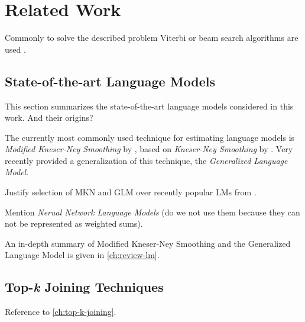 \chapter{Related Work}

\begin{draft}
Commonly to solve the described problem Viterbi or beam search algorithms are
used .
\end{draft}


\section{State-of-the-art Language Models}

\begin{draft}
This section summarizes the state-of-the-art language models considered in this
work.
And their origins?
\end{draft}

The currently most commonly used \parencite{JurafskyMartin2009,Chelba2013}
technique for estimating language models is \emph{Modified Kneser-Ney Smoothing}
by \textcite{ChenGoodman1996,ChenGoodman1998,ChenGoodman1999}, based on
\emph{Kneser-Ney Smoothing} by \textcite{KneserNey1995}.
Very recently \textcite{Pickhardt2014} provided a generalization of this technique,
the \emph{Generalized Language Model}.

\begin{draft}
Justify selection of MKN and GLM over recently popular LMs from
\parencite{Chelba2013}.

Mention \emph{Nerual Network Language Models} \parencite{Bengio2003,Mikolov2012}
(do we not use them because they can not be represented as weighted sums).
\end{draft}

An in-depth summary of Modified Kneser-Ney Smoothing and the Generalized
Language Model is given in \cref{ch:review-lm}.

\section{Top-\emph{k} Joining Techniques}


\begin{draft}
Reference to \cref{ch:top-k-joining}.
\end{draft}

